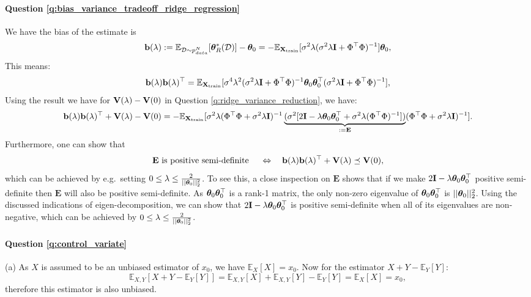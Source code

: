 \paragraph{Question \ref{q:bias_variance_tradeoff_ridge_regression}}
We have the bias of the estimate is
\begin{equation*}
\mathbf{b}(\lambda) := \mathbb{E}_{\mathcal{D} \sim p_{data}^N}[\bm{\theta}^*_R(\mathcal{D})] - \bm{\theta}_0 = - \mathbb{E}_{\mathbf{X}_{\text{train}}}[ \sigma^2 \lambda ( \sigma^2 \lambda \mathbf{I} + \Phi^\top \Phi )^{-1} ] \bm{\theta}_0,
\end{equation*}
This means:
\begin{equation*}
\mathbf{b}(\lambda) \mathbf{b}(\lambda)^\top = \mathbb{E}_{\mathbf{X}_{\text{train}}}[ \sigma^4 \lambda^2 ( \sigma^2 \lambda \mathbf{I} + \Phi^\top \Phi )^{-1} \bm{\theta}_0 \bm{\theta}_0^\top ( \sigma^2 \lambda \mathbf{I} + \Phi^\top \Phi )^{-1} ],
\end{equation*}
Using the result we have for $\mathbf V(\lambda) - \mathbf V(0)$ in Question \ref{q:ridge_variance_reduction}, we have:
\begin{equation*}
\mathbf{b}(\lambda) \mathbf{b}(\lambda)^\top + \mathbf V(\lambda) - \mathbf V(0) = - \mathbb{E}_{\mathbf{X}_{\text{train}}}[ \sigma^2 \lambda (\Phi^\top \Phi + \sigma^2 \lambda \mathbf{I})^{-1} \underbrace{(\sigma^2 [ 2 \mathbf{I} - \lambda \bm{\theta}_0 \bm{\theta}_0^\top + \sigma^2 \lambda (\Phi^\top \Phi)^{-1}] )}_{:= \mathbf{E}} (\Phi^\top \Phi + \sigma^2 \lambda \mathbf{I})^{-1} ].
\end{equation*} 
Furthermore, one can show that
\begin{equation*}
 \mathbf{E} \text{ is positive semi-definite } \quad \Leftrightarrow \quad \mathbf{b}(\lambda) \mathbf{b}(\lambda)^\top + \mathbf V(\lambda) \preceq \mathbf V(0),
\end{equation*}
which can be achieved by e.g.~setting $0 \leq \lambda \leq \frac{2}{|| \bm{\theta}_0 ||_2^2}$. To see this, a close inspection on $\mathbf{E}$ shows that if we make $2 \mathbf{I} - \lambda \bm{\theta}_0 \bm{\theta}_0^\top$ positive semi-definite then $\mathbf{E}$ will also be positive semi-definite. As $\bm{\theta}_0 \bm{\theta}_0^\top$ is a rank-1 matrix, the only non-zero eigenvalue of $\bm{\theta}_0 \bm{\theta}_0^\top$ is $|| \bm{\theta}_0 ||_2^2$. Using the discussed indications of eigen-decomposition, we can show that $2 \mathbf{I} - \lambda \bm{\theta}_0 \bm{\theta}_0^\top$ is positive semi-definite when all of its eigenvalues are non-negative, which can be achieved by $0 \leq \lambda \leq \frac{2}{|| \bm{\theta}_0 ||_2^2}$.

\paragraph{Question \ref{q:control_variate}}
(a) As $X$ is assumed to be an unbiased estimator of $x_0$, we have $\mathbb{E}_X[X] = x_0$. Now for the estimator $X + Y - \mathbb{E}_Y[Y]$:
$$\mathbb{E}_{X, Y}[ X + Y - \mathbb{E}_Y[Y] ] = \mathbb{E}_{X, Y}[X] + \mathbb{E}_{X, Y}[Y] - \mathbb{E}_Y[Y] = \mathbb{E}_{X}[X] = x_0,$$
therefore this estimator is also unbiased. 


